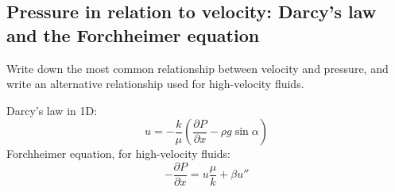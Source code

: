 \subsection{Pressure in relation to velocity: Darcy's law and the Forchheimer equation} %
\label{sub:pressure_in_relation_to_velocity_darcy_s_law}

\begin{question}
  Write down the most common relationship between velocity and pressure, and write an alternative relationship used for high-velocity fluids.
\end{question}

Darcy's law in 1D:
\begin{equation}
  u = - \frac{k}{\mu} \left( \frac{\partial P}{\partial  x} - \rho g \sin \alpha \right)
\end{equation}
Forchheimer equation, for high-velocity fluids:
\begin{equation}
  - \frac{\partial P}{\partial  x} = u \frac{\mu}{k} + \beta u''
\end{equation}


